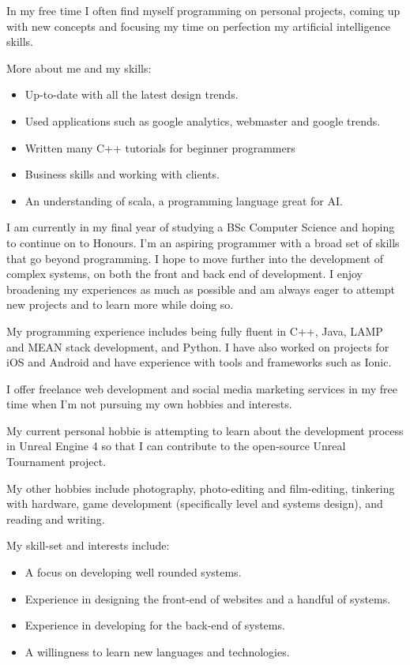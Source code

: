 	In my free time I often find myself programming on personal projects, coming up with new concepts and focusing my time on perfection my artificial intelligence skills. 

	\noindent
	More about me and my skills:
    \begin{itemize}
        \item Up-to-date with all the latest design trends.
        \item Used applications such as google analytics, webmaster and google trends. 
        \item Written many C++ tutorials for beginner programmers
        \item Business skills and working with clients. 
        \item An understanding of scala, a programming language great for AI. 
    \end{itemize}
    
%
%
\newpage
{}
I am currently in my final year of studying a BSc Computer Science and hoping to continue on to Honours. I'm an aspiring programmer with a broad set of skills that go beyond programming. I hope to move further into the development of complex systems, on both the front and back end of development. I enjoy broadening my experiences as much as possible and am always eager to attempt new projects and to learn more while doing so.

My programming experience includes being fully fluent in C++, Java, LAMP and MEAN stack development, and Python. I have also worked on projects for iOS and Android and have experience with tools and frameworks such as Ionic.

I offer freelance web development and social media marketing services in my free time when I'm not pursuing my own hobbies and interests.

My current personal hobbie is attempting to learn about the development process in Unreal Engine 4 so that I can contribute to the open-source Unreal Tournament project.

My other hobbies include photography, photo-editing and film-editing, tinkering with hardware, game development (specifically level and systems design), and reading and writing.

My skill-set and interests include:
\begin{itemize}

        \item A focus on developing well rounded systems.
        
        \item Experience in designing the front-end of websites and a handful of systems.
        
        \item Experience in developing for the back-end of systems.
        
        \item A willingness to learn new languages and technologies.
        
    \end{itemize}

